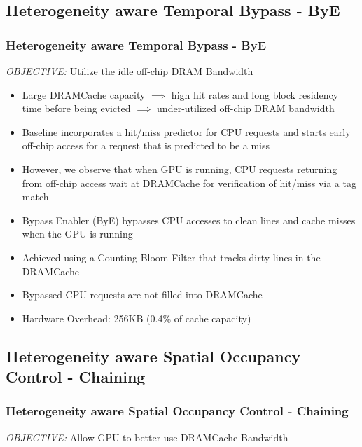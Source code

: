 \documentclass{beamer}
\begin{document}

\subsection{Heterogeneity aware Temporal Bypass - ByE}
\begin{frame}
\frametitle{Heterogeneity aware Temporal Bypass - ByE}
\emph{OBJECTIVE:} Utilize the idle off-chip DRAM Bandwidth
\begin{itemize}
	\item Large DRAMCache capacity $\implies$ high hit rates and long block residency time before being evicted $\implies$ under-utilized off-chip DRAM bandwidth
	\item Baseline incorporates a hit/miss predictor for CPU requests and starts early off-chip access for a request that is predicted to be a miss
	\item However, we observe that when GPU is running, CPU requests returning from off-chip access wait at DRAMCache for verification of hit/miss via a tag match
	\item Bypass Enabler (ByE) bypasses CPU accesses to clean lines and cache misses when the GPU is running
	\item Achieved using a Counting Bloom Filter that tracks dirty lines in the DRAMCache
	\item Bypassed CPU requests are not filled into DRAMCache
	\item Hardware Overhead: 256KB (0.4\% of cache capacity)
\end{itemize}
\end{frame}

\subsection{Heterogeneity aware Spatial Occupancy Control - Chaining}
\begin{frame}
\frametitle{Heterogeneity aware Spatial Occupancy Control - Chaining}
\emph{OBJECTIVE:} Allow GPU to better use DRAMCache Bandwidth
\end{frame}

\end{document}
